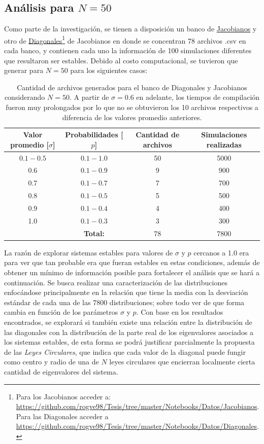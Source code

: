 \subsection{Análisis para $N=50$}

Como parte de la investigación, se tienen  a disposición un banco de \href{https://github.com/rogve98/Tesis/tree/master/Notebooks/Datos/Jacobianos}{Jacobianos} y otro de \href{https://github.com/rogve98/Tesis/tree/master/Notebooks/Datos/Diagonales}{Diagonales}\footnote{Para los Jacobianos acceder a: \url{https://github.com/rogve98/Tesis/tree/master/Notebooks/Datos/Jacobianos}. Para las Diagonales acceder a \url{https://github.com/rogve98/Tesis/tree/master/Notebooks/Datos/Diagonales}.} de Jacobianos en donde se concentran 78 archivos .csv en cada banco, y contienen cada uno la información de 100 simulaciones diferentes que resultaron ser estables. Debido al costo computacional, se tuvieron que generar para $N=50$ para los siguientes casos:
\begin{table}[h!]
	\centering
	 \begin{tabular}{|c|c|c|c|}
		\hline
		Valor promedio [$\sigma$] & Probabilidades [$p$] & Cantidad de archivos & Simulaciones realizadas \\ \hline
		$0.1-0.5$  & $0.1-1.0$  & 50 & 5000  \\ \hline
		0.6  & $0.1-0.9$  & 9 & 900 \\ \hline
		0.7  & $0.1-0.7$  & 7 & 700 \\ \hline
		0.8  & $0.1-0.5$  & 5 & 500 \\ \hline
		0.9  & $0.1-0.4$  & 4 & 400 \\ \hline
		1.0  & $0.1-0.3$  & 3 & 300 \\ \hline
		& \textbf{Total:} & 78& 7800\\ \hline
	\end{tabular}
	\caption{Cantidad de archivos generados para el banco de Diagonales y Jacobianos considerando $N=50$. A partir de $\sigma=0.6$ en adelante, los tiempos de compilación fueron muy prolongados por lo que no se obtuvieron los 10 archivos respectivos a diferencia de los valores promedio anteriores.}
	\label{tab:Simulaciones}
\end{table} 

La razón de explorar sistemas estables para valores de $\sigma$ y $p$ cercanos a 1.0 era para ver que tan probable era que fueran estables en estas condiciones, además de obtener un mínimo de información posible para fortalecer el análisis que se hará a continuación. Se busca realizar una caracterización de las distribuciones enfocándose principalmente en la relación que tiene la media con la desviación estándar de cada una de las 7800 distribuciones; sobre todo ver de que forma cambia en función de los parámetros $\sigma$ y $p$. Con base en los resultados encontrados, se explorará si también existe una relación entre la distribución de las diagonales con la distribución de la parte real de los eigenvalores asociados a los sistemas estables, de esta forma se podrá justificar parcialmente la propuesta de las \textit{Leyes Circulares}, que indica que cada valor de la diagonal puede fungir como centro y radio de una de $N$ leyes circulares que encierran localmente cierta cantidad de eigenvalores del sistema.

